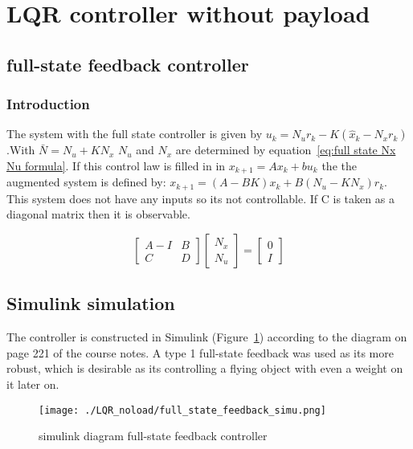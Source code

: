 \section{LQR controller without payload}
\subsection{full-state feedback controller}
\subsubsection{Introduction}
The system with the full state controller is given by $u_k=N_ur_k - K(\hat{x}_k-N_xr_k)$.With $\bar{N} = N_u + KN_x$ $N_u$ and $N_x$ are determined by equation~\ref{eq:full state Nx Nu formula}. If this control law is filled in in $x_{k+1} = Ax_k + bu_k$ the the augmented system is defined by: $x_{k+1}=(A-BK)x_k + B(N_u - KN_x)r_k$. This system does not have any inputs so its not controllable. If C is taken as a diagonal matrix then it is observable.

\begin{equation}
	\begin{bmatrix}
		A-I & B \\
		C & D
	\end{bmatrix}
	\begin{bmatrix}
		N_x\\
		N_u
	\end{bmatrix}
	=
	\begin{bmatrix}
		0 \\
		I
	\end{bmatrix}
	\label{eq:full state Nx Nu formula}
\end{equation}

\subsection{Simulink simulation}
The controller is constructed in Simulink (Figure~\ref{fig:diagram full-state feedback controller}) according to the diagram on page 221 of the course notes. A type 1 full-state feedback was used as its more robust, which is desirable as its controlling a flying object with even a weight on it later on. 

\begin{figure}[H]
	\centering
	\texttt{[image: ./LQR\_noload/full\_state\_feedback\_simu.png]}
	\caption{simulink diagram full-state feedback controller}
	\label{fig:diagram full-state feedback controller}
\end{figure}

